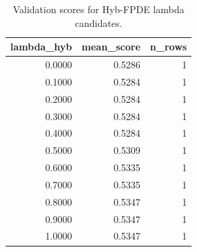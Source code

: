 \begin{table}[t]
\caption{Validation scores for Hyb-FPDE lambda candidates.}
\label{tab:lambda_distribution_computed}
\centering
\begin{tabular}{rrr}
\toprule
lambda\_hyb & mean\_score & n\_rows \\
\midrule
0.0000 & 0.5286 & 1 \\
0.1000 & 0.5284 & 1 \\
0.2000 & 0.5284 & 1 \\
0.3000 & 0.5284 & 1 \\
0.4000 & 0.5284 & 1 \\
0.5000 & 0.5309 & 1 \\
0.6000 & 0.5335 & 1 \\
0.7000 & 0.5335 & 1 \\
0.8000 & 0.5347 & 1 \\
0.9000 & 0.5347 & 1 \\
1.0000 & 0.5347 & 1 \\
\bottomrule
\end{tabular}

\end{table}
